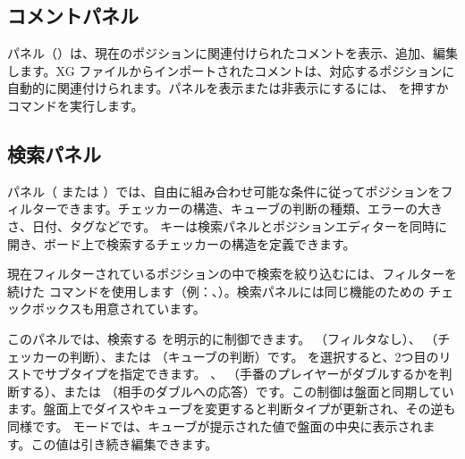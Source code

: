 \documentclass[letterpaper,10pt,dvipdfmx]{sphinxmanual}
\begin{document}
\subsection{コメントパネル}
\label{\detokenize{manuel:panneau-commentaires}}\label{\detokenize{manuel:id4}}
\sphinxAtStartPar
{} パネル（）は、現在のポジションに関連付けられたコメントを表示、追加、編集します。XG ファイルからインポートされたコメントは、対応するポジションに自動的に関連付けられます。パネルを表示または非表示にするには、 を押すか  コマンドを実行します。


\subsection{検索パネル}
\label{\detokenize{manuel:panneau-recherche}}\label{\detokenize{manuel:id5}}
\sphinxAtStartPar
{} パネル（ または ）では、自由に組み合わせ可能な条件に従ってポジションをフィルターできます。チェッカーの構造、キューブの判断の種類、エラーの大きさ、日付、タグなどです。 キーは検索パネルとポジションエディターを同時に開き、ボード上で検索するチェッカーの構造を定義できます。

\sphinxAtStartPar
現在フィルターされているポジションの中で検索を絞り込むには、フィルターを続けた  コマンドを使用します（例：、）。検索パネルには同じ機能のための  チェックボックスも用意されています。

\sphinxAtStartPar
このパネルでは、検索する  を明示的に制御できます。  （フィルタなし）、  （チェッカーの判断）、または  （キューブの判断）です。  を選択すると、2つ目のリストでサブタイプを指定できます。  、  （手番のプレイヤーがダブルするかを判断する）、または  （相手のダブルへの応答）です。この制御は盤面と同期しています。盤面上でダイスやキューブを変更すると判断タイプが更新され、その逆も同様です。  モードでは、キューブが提示された値で盤面の中央に表示されます。この値は引き続き編集できます。
\end{document}

